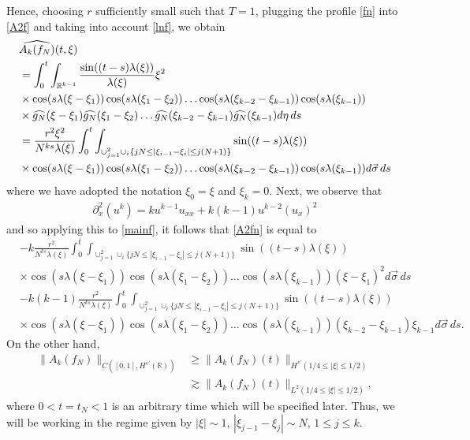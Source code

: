 \documentclass{amsart}
\newcommand{\wh}{\widehat}
\newcommand{\p}{\partial}
\begin{document}
Hence, choosing $r$ sufficiently small such that $T=1$, plugging the profile \eqref{fn} into \eqref{A2f} and taking into account \eqref{lnf}, we obtain
\begin{equation}
\aligned
&\widehat{A_{k}(f_N)}(t,\xi)\\
&=\int_0^t \int_{\mathbb{R}^{k-1}} \frac{\sin((t-s) \lambda(\xi))}{\lambda(\xi)} \xi^2 
\\
& \times \cos(s \lambda(\xi- \xi_{1}))
\cos(s \lambda(\xi_{1}- \xi_{2}))\dots
\cos(s \lambda(\xi_{k-2} - \xi_{k-1}))
\cos(s\lambda(\xi_{k-1}))
\\
& \times \widehat{g_N}(\xi - \xi_{1})\widehat{g_N}(\xi_{1} - \xi_{2})\dots
\wh{g_{N}}(\xi_{k-2} - \xi_{k-1})
\wh{g_{N}}(\xi_{k-1})
d \eta\,ds\\
&=\frac{r^2 \xi^2}{N^{ks}\lambda(\xi)}\int_0^t \int_{\cup_{j=1}^{2} \cup_{i} \{jN \leq |\xi_{i-1}-\xi_{i}|\leq j(N+1)\}}\sin((t-s) \lambda(\xi))
\\
& \times \cos(s \lambda(\xi- \xi_{1}))
\cos(s \lambda(\xi_{1}- \xi_{2}))\dots
\cos(s\lambda(\xi_{k-2} - \xi_{k-1}))
\cos(s\lambda(\xi_{k-1}))d \vec{\sigma}\,ds
\label{A2fn}
\endaligned
\end{equation}
where we have adopted the notation $\xi_{0} = \xi$ and $\xi_{k} = 0$.
Next, we observe that
\begin{equation*}
\begin{split}
\p_{x}^	2(u^{k}) = ku^{k-1}u_{xx} + k(k-1)u^{k-2}(u_{x})^{2}
\end{split}
\end{equation*}
and so applying this to \eqref{mainf}, it follows that \eqref{A2fn} is equal to
\begin{equation}
  \label{fg}
\begin{split}
& -k\frac{r^2}{N^{ks}\lambda(\xi)}\int_0^t 
\int_{\cup_{j=1}^{2} \cup_{i}\{jN \leq |\xi_{i-1}-\xi_{i}|\leq j(N+1)\}}
\sin((t-s) \lambda(\xi))
\\
& \times 
\cos(s \lambda(\xi- \xi_{1}))
\cos(s \lambda(\xi_{1}- \xi_{2}))\dots\cos(s\lambda(\xi_{k-1}))
(\xi - \xi_{1})^{2}
d \vec{\sigma}\,ds
\\
& - k(k-1)
\frac{r^2}{N^{ks}\lambda(\xi)}\int_0^t 
\int_{\cup_{j=1}^{2} \cup_{i}\{jN \leq |\xi_{i-1}-\xi_{i}|\leq j(N+1)\}}
\sin((t-s) \lambda(\xi))
\\
& \times
\cos(s \lambda(\xi- \xi_{1}))
\cos(s \lambda(\xi_{1}- \xi_{2}))\dots\cos(s\lambda(\xi_{k-1}))
(\xi_{k-2} - \xi_{k-1})\xi_{k-1}
d \vec{\sigma}\,ds.
\end{split}
\end{equation}
On the other hand,
\begin{equation}
  \begin{split}
\|A_{k}(f_N)\|_{C([0,1], H^{s'}(\mathbb{R}))} &\geq \|A_{k}(f_N)(t)\|_{H^{s'}(1/4\leq |\xi| \leq 1/2)}\\ &\gtrsim \|A_{k}(f_N)(t)\|_{L^2(1/4\leq |\xi| \leq 1/2)},
  \label{gh}
\end{split}
\end{equation}
where $0<t=t_N<1$ is an arbitrary time which will be specified later. 
Thus, we will be working in the regime given by $|\xi| \sim 1$, $|\xi_{j-1} - \xi_{j}|\sim N$, $1 \le j \le k$. 
\end{document}
